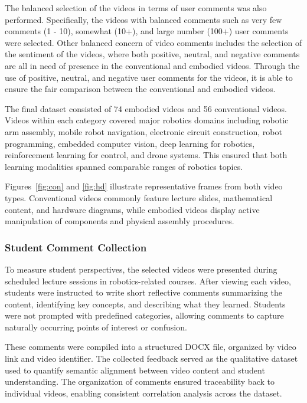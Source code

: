 \documentclass[fleqn,10pt]{JLA_article} %
\begin{document}
The balanced selection of the videos in terms of user comments was also performed. Specifically, the videos with balanced comments such as very few comments (1 - 10), somewhat (10+), and large number (100+) user comments were selected. Other balanced concern of video comments includes the selection of the sentiment of the videos, where both positive, neutral, and negative comments are all in need of presence in the conventional and embodied videos. Through the use of positive, neutral, and negative user comments for the videos, it is able to ensure the fair comparison between the conventional and embodied videos.

The final dataset consisted of 74 embodied videos and 56 conventional videos. Videos within each category covered major robotics domains including robotic arm assembly, mobile robot navigation, electronic circuit construction, robot programming, embedded computer vision, deep learning for robotics, reinforcement learning for control, and drone systems. This ensured that both learning modalities spanned comparable ranges of robotics topics.

Figures~\ref{fig:con} and \ref{fig:hd} illustrate representative frames from both video types. Conventional videos commonly feature lecture slides, mathematical content, and hardware diagrams, while embodied videos display active manipulation of components and physical assembly procedures.

\subsubsection{Student Comment Collection}

To measure student perspectives, the selected videos were presented during scheduled lecture sessions in robotics-related courses. After viewing each video, students were instructed to write short reflective comments summarizing the content, identifying key concepts, and describing what they learned. Students were not prompted with predefined categories, allowing comments to capture naturally occurring points of interest or confusion.

These comments were compiled into a structured DOCX file, organized by video link and video identifier. The collected feedback served as the qualitative dataset used to quantify semantic alignment between video content and student understanding. The organization of comments ensured traceability back to individual videos, enabling consistent correlation analysis across the dataset.
\end{document}
